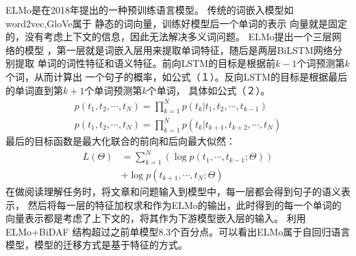 ELMo是在2018年提出的一种预训练语言模型。
传统的词嵌入模型如word2vec,GloVe属于
静态的词向量，训练好模型后一个单词的表示
向量就是固定的，没有考虑上下文的信息，因此无法解决多义词问题。
ELMo提出一个三层网络的模型
，第一层就是词嵌入层用来提取单词特征，随后是两层BiLSTM网络分别提取
单词的词性特征和语义特征。前向LSTM的目标是根据前$k-1$个词预测第$k$个词，从而计算出
一个句子的概率，如公式（１）。反向LSTM的目标是根据最后的单词直到第$k+1$个单词预测第$k$个单词，
具体如公式（２）。
\begin{gather}
    p(t_1,t_2,\cdots,t_N)=\prod_{k=1}^{N}p(t_k|t_1,t_2,\cdots,t_{k-1})\\
    p(t_1,t_2,\cdots,t_N)=\prod_{k=1}^{N}p(t_k|t_{k+1},t_{k+2},\cdots,t_{N})
\end{gather}
最后的目标函数是最大化联合的前向和后向最大似然：
\begin{equation}
    \begin{split}
    L(\Theta)&=\sum_{k=1}^{N}(\log p(t_1,\cdots,t_{k-1};\Theta)) \\
        &+\log p(t_{k+1},\cdots,t_N;\Theta)
    \end{split}
\end{equation}
在做阅读理解任务时，将文章和问题输入到模型中，每一层都会得到句子的语义表示，
然后将每一层的特征加权求和作为ELMo的输出，此时得到的每一个单词的
向量表示都是考虑了上下文的，将其作为下游模型嵌入层的输入。
利用ELMo+BiDAF
结构超过之前单模型8.3个百分点。可以看出ELMo属于自回归语言模型，模型的迁移方式是基于特征的方式。
\begin{table*}[!ht]
    \caption{预训练语言模型对比}
    \centering
    \vspace{10pt}
\end{table*}



